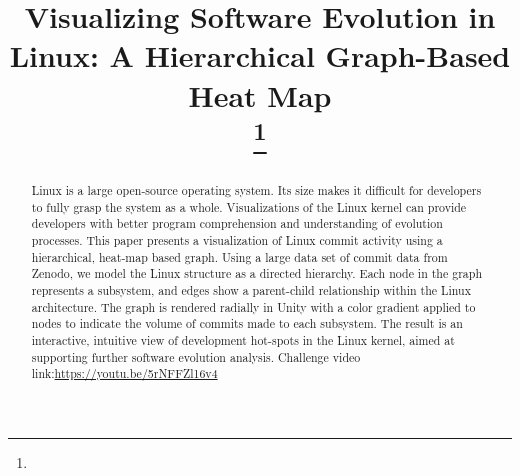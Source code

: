 \documentclass[conference]{IEEEtran}
\begin{document}
\title{Visualizing Software Evolution in Linux: A Hierarchical Graph-Based Heat Map\\

\thanks{}
}

\author{
\and
{}
}



\maketitle

\begin{abstract}
Linux is a large open-source operating system. Its size makes it difficult for developers to fully grasp the system as a whole. Visualizations of the Linux kernel can provide developers with better program comprehension and understanding of evolution processes. This paper presents a visualization of Linux commit activity using a hierarchical, heat-map based graph. Using a large data set of commit data from Zenodo, we model the Linux structure as a directed hierarchy. Each node in the graph represents a subsystem, and edges show a parent-child relationship within the Linux architecture. The graph is rendered radially in Unity with a color gradient applied to nodes to indicate the volume of commits made to each subsystem. The result is an interactive, intuitive view of development hot-spots in the Linux kernel, aimed at supporting further software evolution analysis. Challenge video link:\space\textcolor{blue}{\url{https://youtu.be/5rNFFZl16v4}}
\end{abstract}
\end{document}
